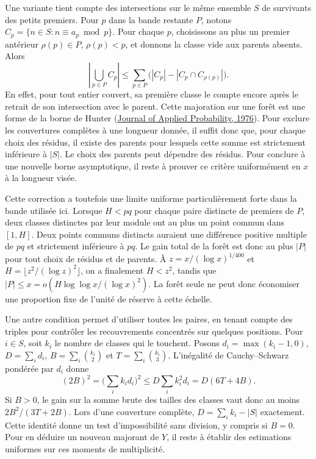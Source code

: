 \documentclass[11pt,a4paper]{article}
\begin{document}
Une variante tient compte des intersections sur le même ensemble $S$
de survivants des petits premiers. Pour $p$ dans la bande restante $P$,
notons $C_p=\{n\in S:n\equiv a_p\bmod p\}$. Pour chaque $p$, choisissons
au plus un premier antérieur $\rho(p)\in P$, $\rho(p)<p$, et donnons la
classe vide aux parents absents. Alors
\[
 \left|\bigcup_{p\in P} C_p\right|
 \le \sum_{p\in P}\bigl(|C_p|-|C_p\cap C_{\rho(p)}|\bigr).
\]
En effet, pour tout entier couvert, sa première classe le compte encore
après le retrait de son intersection avec le parent. Cette majoration
sur une forêt est une forme de la borne de Hunter
(\href{https://www.cambridge.org/core/journals/journal-of-applied-probability/article/an-upper-bound-for-the-probability-of-a-union/092D711504BA968EF0D1D903A2685D60}{Journal of Applied Probability, 1976}).
Pour exclure les couvertures complètes à une longueur donnée, il suffit
donc que, pour chaque choix des résidus, il existe des parents pour
lesquels cette somme est strictement inférieure à $|S|$. Le choix des
parents peut dépendre des résidus. Pour conclure à une nouvelle borne
asymptotique, il reste à prouver ce critère uniformément en $x$ à la
longueur visée.

Cette correction a toutefois une limite uniforme particulièrement forte
dans la bande utilisée ici. Lorsque $H<pq$ pour chaque paire distincte
de premiers de $P$, deux classes distinctes par leur module ont au plus
un point commun dans $[1,H]$. Deux points communs distincts auraient
une différence positive multiple de $pq$ et strictement inférieure à
$pq$. Le gain total de la forêt est donc au plus $|P|$ pour tout choix
de résidus et de parents. À $z=x/(\log x)^{1/400}$ et
$H=\lfloor z^2/(\log z)^2\rfloor$, on a finalement $H<z^2$, tandis que
$|P|\le x=o(H\log\log x/(\log x)^2)$. La forêt seule ne peut donc
économiser une proportion fixe de l'unité de réserve à cette échelle.

Une autre condition permet d'utiliser toutes les paires, en tenant
compte des triples pour contrôler les recouvrements concentrés sur
quelques positions. Pour $i\in S$, soit $k_i$ le nombre de classes qui
le touchent. Posons $d_i=\max(k_i-1,0)$, $D=\sum_i d_i$,
$B=\sum_i\binom{k_i}{2}$ et $T=\sum_i\binom{k_i}{3}$.
L'inégalité de Cauchy--Schwarz pondérée par $d_i$ donne
\[
 (2B)^2=\Big(\sum_i k_id_i\Big)^2
 \le D\sum_i k_i^2d_i=D(6T+4B).
\]
Si $B>0$, le gain sur la somme brute des tailles des classes vaut
donc au moins $2B^2/(3T+2B)$. Lors d'une couverture complète,
$D=\sum_i k_i-|S|$ exactement. Cette identité donne un test
d'impossibilité sans division, y compris si $B=0$.
Pour en déduire un nouveau majorant de $Y$, il reste à établir des
estimations uniformes sur ces moments de multiplicité.
\end{document}
